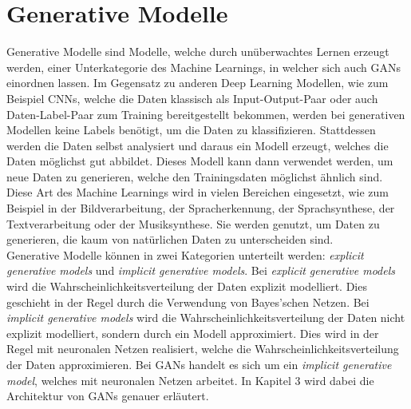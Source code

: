 \section{Generative Modelle}

\noindent Generative Modelle sind Modelle, welche durch unüberwachtes Lernen erzeugt werden, einer Unterkategorie des Machine Learnings, in welcher sich auch \acp{GAN} einordnen lassen. Im Gegensatz zu anderen Deep Learning Modellen, wie zum Beispiel \acfp{CNN}, welche die Daten klassisch als Input-Output-Paar oder auch Daten-Label-Paar zum Training bereitgestellt bekommen, werden bei generativen Modellen keine Labels benötigt, um die Daten zu klassifizieren. Stattdessen werden die Daten selbst analysiert und daraus ein Modell erzeugt, welches die Daten möglichst gut abbildet. Dieses Modell kann dann verwendet werden, um neue Daten zu generieren, welche den Trainingsdaten möglichst ähnlich sind.\cite{mlbook}\\

\noindent Diese Art des Machine Learnings wird in vielen Bereichen eingesetzt, wie zum Beispiel in der Bildverarbeitung, der Spracherkennung, der Sprachsynthese, der Textverarbeitung oder der Musiksynthese. Sie werden genutzt, um Daten zu generieren, die kaum von natürlichen Daten zu unterscheiden sind. \\

\noindent Generative Modelle können in zwei Kategorien unterteilt werden: \textit{explicit generative models} und \textit{implicit generative models}. Bei \textit{explicit generative models} wird die Wahrscheinlichkeitsverteilung der Daten explizit modelliert. Dies geschieht in der Regel durch die Verwendung von Bayes'schen Netzen. Bei \textit{implicit generative models} wird die Wahrscheinlichkeitsverteilung der Daten nicht explizit modelliert, sondern durch ein Modell approximiert. Dies wird in der Regel mit neuronalen Netzen realisiert, welche die Wahrscheinlichkeitsverteilung der Daten approximieren. Bei \acp{GAN} handelt es sich um ein \textit{implicit generative model}, welches mit neuronalen Netzen arbeitet. In Kapitel 3 wird dabei die Architektur von \acp{GAN} genauer erläutert.\\


\newpage